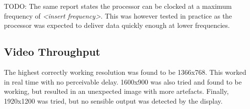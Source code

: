 TODO:
The same report states the processor can be clocked at a maximum frequency of \emph{<insert frequency>}. This was however tested in practice as the processor was expected to deliver data quickly enough at lower frequencies.

\subsection{Video Throughput}
The highest correctly working resolution was found to be 1366x768. This worked in real time with no perceivable delay. 1600x900 was also tried and found to be working, but resulted in an unexpected image with more artefacts. Finally, 1920x1200 was tried, but no sensible output was detected by the display.
